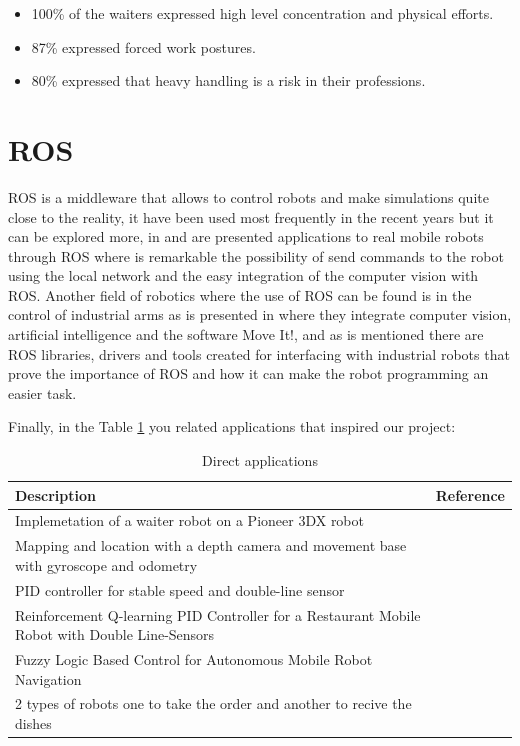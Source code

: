 \begin{itemize}
\item 100\% of the waiters expressed high level concentration and physical efforts.
\item 87\% expressed forced work postures.
 
\item 80\% expressed that heavy handling is a risk in their professions.

\end{itemize}


\section{ROS} 
 ROS is a middleware that allows to control robots and make simulations quite close to the reality, it have been used most frequently in the recent years but it can be explored more, in \citep{osio2018desenvolupament} and \citep{zhang2020robot} are presented applications to real mobile robots through ROS where is remarkable the possibility of send commands to the robot using the local network and the easy integration of the computer vision with ROS. Another field of robotics where the use of ROS can be found is in the control of industrial arms as is presented in \citep{arents2018integration} where they integrate computer vision, artificial intelligence and the software Move It!, and as is mentioned there are ROS libraries, drivers and tools created for interfacing with industrial robots that prove the importance of ROS and how it can make the robot programming an easier task.
 

Finally, in the Table \ref{tab:related_work_direct} you related applications that inspired our project:


\begin{table}[h!]
\caption{Direct applications}\label{tab:related_work_direct}
\begin{centering}
\begin{tabular}{>{\centering}p{7cm}>{\centering}p{4cm}}
\hline 
\raggedright{}Description & \raggedright{}Reference\tabularnewline
\hline 
\raggedright{Implemetation of a waiter robot on a Pioneer 3DX robot} & \raggedright{}\citep{escudero2012robot}\tabularnewline
\hline 
\raggedright{}Mapping and location with a depth camera and movement base with gyroscope and odometry & \raggedright{}\citep{zhang2016approach}\tabularnewline
\hline 
\raggedright{}PID controller for stable speed and double-line sensor& \raggedright{}\citep{thanh2019restaurant}\tabularnewline
\hline 
\raggedright{}Reinforcement Q-learning PID Controller for a Restaurant Mobile Robot with Double Line-Sensors & \raggedright{}\citep{thanh2020reinforcement}\tabularnewline
\hline 
\raggedright{}Fuzzy Logic Based Control for Autonomous Mobile Robot Navigation& \raggedright{}\citep{omrane2016fuzzy}\tabularnewline
\hline 
\raggedright{}2 types of robots one to take the order and another to recive the dishes & \raggedright{}\citep{eksiri2015restaurant}\tabularnewline
\hline 
\end{tabular}
\par\end{centering}
\end{table}


